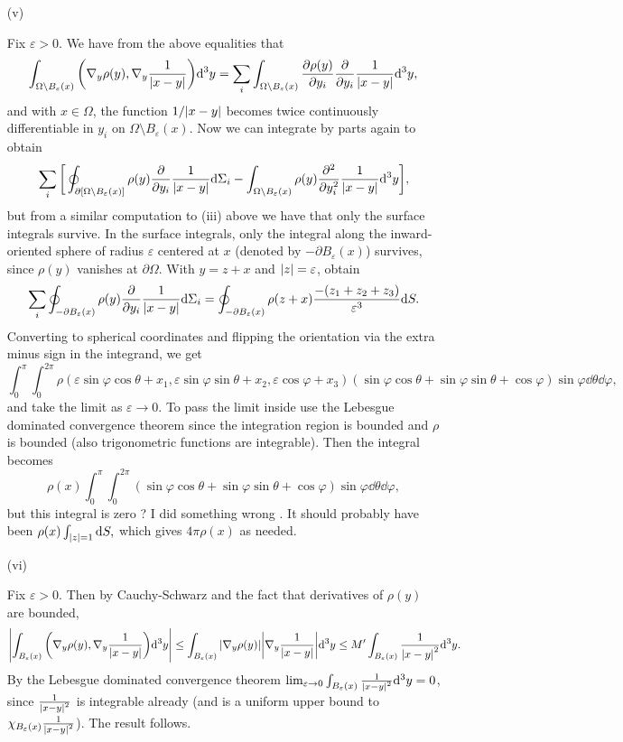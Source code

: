 \documentclass[11pt]{article}
\newcommand{\sad}{\raisebox{-.28em}{\resizebox{1.5em}{!}{\frownie}}}
\begin{document}
\begin{enumerate}
\begin{enumerate}
       
        \item[(v)]%
        
        Fix $\varepsilon>0$. We have from the above equalities that \[\int_{\Omega\setminus B_{\varepsilon}(x)}\bigg(\nabla_y\rho(y),\nabla_y\frac{1}{\abs{x-y}}\bigg)\dd^3y = \sum_i \int_{\Omega\setminus B_\varepsilon(x)} \pdv{\rho(y)}{y_i}\pdv{y_i}\frac{1}{\abs{x-y}}\dd^3y,\] and with $x\in\Omega$, the function $1/\abs{x-y}$ becomes twice continuously differentiable in $y_i$ on $\Omega\setminus B_\varepsilon(x)$. Now we can integrate by parts again to obtain \[\sum_i \bigg[\oint_{\partial[\Omega\setminus B_\varepsilon(x)]} \rho(y)\pdv{y_i}\frac{1}{\abs{x-y}}\dd \Sigma_i- \int_{\Omega\setminus B_\varepsilon(x)} \rho(y) \pdv[2]{y_i}\frac{1}{\abs{x-y}}\dd^3y\bigg],\] but from a similar computation to (iii) above we have that only the surface integrals survive. In the surface integrals, only the integral along the inward-oriented sphere of radius $\varepsilon$ centered at $x$ (denoted by $-\partial B_\varepsilon(x)$) survives, since $\rho(y)$ vanishes at $\partial \Omega$. With $y=z+ x$ and $\abs{z} = \varepsilon$, obtain \[\sum_i \oint_{-\partial B_\varepsilon(x)} \rho(y)\pdv{y_i}\frac{1}{\abs{x-y}}\dd \Sigma_i = \oint_{-\partial B_\varepsilon(x)}\rho(z+x)\frac{-(z_1+z_2+z_3)}{\varepsilon^3}\dd S.\] Converting to spherical coordinates and flipping the orientation via the extra minus sign in the integrand, we get \[\int_0^\pi\int_0^{2\pi}\rho(\varepsilon\sin\varphi\cos\theta +x_1, \varepsilon\sin\varphi\sin\theta +x_2, \varepsilon\cos\varphi+x_3)(\sin\varphi\cos\theta + \sin\varphi\sin\theta + \cos\varphi)\sin\varphi\dd\theta\dd\varphi,\] and take the limit as $\varepsilon\to 0$. To pass the limit inside use the Lebesgue dominated convergence theorem since the integration region is bounded and $\rho$ is bounded (also trigonometric functions are integrable). Then the integral becomes \[\rho(x)\int_0^\pi\int_0^{2\pi}(\sin\varphi\cos\theta + \sin\varphi\sin\theta + \cos\varphi)\sin\varphi\dd\theta\dd\varphi,\] but this integral is zero ? I did something wrong \sad. It should probably have been $\rho(x)\int_{\abs{z}=1}\dd S,$ which gives $4\pi \rho(x)$ as needed.
        \item[(vi)] %
        
        Fix $\varepsilon>0$. Then by Cauchy-Schwarz and the fact that derivatives of $\rho(y)$ are bounded, \[\abs{\int_{B_{\varepsilon}(x)}\bigg(\nabla_y\rho(y),\nabla_y\frac{1}{\abs{x-y}}\bigg)\dd^3y}\leq \int_{B_{\varepsilon}(x)}\abs{\nabla_y\rho(y)}\abs{\nabla_y\frac{1}{\abs{x-y}}}\dd^3y\leq M^\prime\int_{B_\varepsilon(x)}\frac{1}{\abs{x-y}^2}\dd^3y.\] By the Lebesgue dominated convergence theorem $\lim_{\varepsilon\to 0}\int_{B_\varepsilon(x)}\frac{1}{\abs{x-y}^2}\dd^3y = 0$, since $\frac{1}{\abs{x-y}^2}$ is integrable already (and is a uniform upper bound to $\chi_{B_\varepsilon(x)}\frac{1}{\abs{x-y}^2}$). The result follows.
    \end{enumerate}


\end{enumerate}
\end{document}
